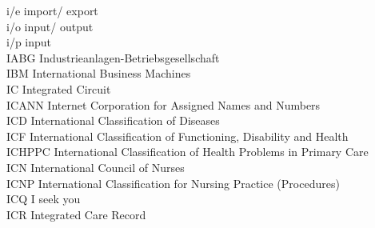 \begin{tabbing}
    \>i/e \>\>import/ export\\

    \>i/o \>\>input/ output\\

    \>i/p \>\>input\\

    \>IABG \>\>Industrieanlagen-Betriebsgesellschaft\\



    \>IBM \>\>International Business Machines\\


    \>IC \>\>Integrated Circuit\\



    \>ICANN \>\>Internet Corporation for Assigned Names and Numbers\\

    \>ICD \>\>International Classification of Diseases\\

    \>ICF \>\>International Classification of Functioning, Disability and Health\\


    \>ICHPPC \>\>International Classification of Health Problems in Primary Care\\


    \>ICN \>\>International Council of Nurses\\

    \>ICNP \>\>International Classification for Nursing Practice (Procedures)\\

    \>ICQ \>\>I seek you\\

    \>ICR \>\>Integrated Care Record\\


\end{tabbing}
